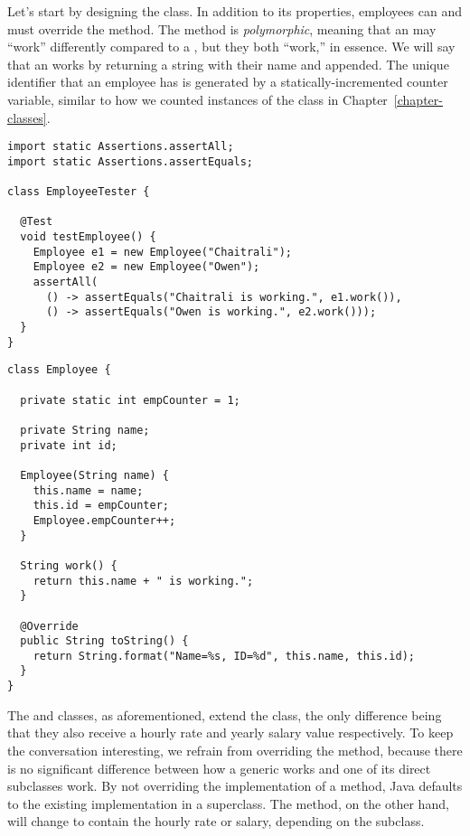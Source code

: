 Let's start by designing the  class. In addition to its properties, employees can  and must override the  method. The  method is \emph{polymorphic}, meaning that an  may ``work'' differently compared to a , but they both ``work,'' in essence. We will say that an  works by returning a string with their name and  appended. The unique identifier that an employee has is generated by a statically-incremented counter variable, similar to how we counted instances of the  class in Chapter~\ref{chapter-classes}.

\begin{lstlisting}[language=MyJava]
import static Assertions.assertAll;
import static Assertions.assertEquals;

class EmployeeTester {

  @Test
  void testEmployee() {
    Employee e1 = new Employee("Chaitrali");
    Employee e2 = new Employee("Owen");
    assertAll(
      () -> assertEquals("Chaitrali is working.", e1.work()),
      () -> assertEquals("Owen is working.", e2.work()));
  }
}
\end{lstlisting}

\begin{lstlisting}[language=MyJava]
class Employee {

  private static int empCounter = 1;

  private String name;
  private int id;

  Employee(String name) {
    this.name = name;
    this.id = empCounter;
    Employee.empCounter++;
  }

  String work() {
    return this.name + " is working.";
  }

  @Override
  public String toString() {
    return String.format("Name=%s, ID=%d", this.name, this.id);
  } 
}
\end{lstlisting}

The  and  classes, as aforementioned, extend the  class, the only difference being that they also receive a hourly rate and yearly salary value respectively. To keep the conversation interesting, we refrain from overriding the  method, because there is no significant difference between how a generic  works and one of its direct subclasses work. By not overriding the implementation of a method, Java defaults to the existing implementation in a superclass. The  method, on the other hand, will change to contain the hourly rate or salary, depending on the subclass.

